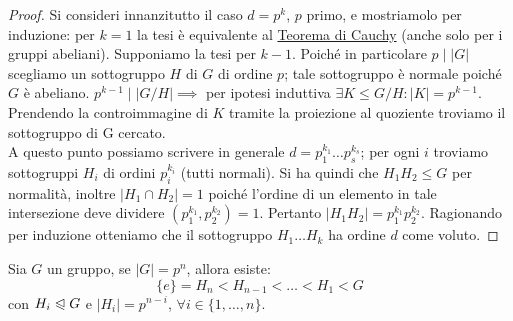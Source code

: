 \documentclass[11pt]{scrartcl}
\begin{document}
\begin{proof}
    Si consideri innanzitutto il caso $d=p^k$, $p$ primo, e mostriamolo per induzione:
    per $k=1$ la tesi è equivalente al \hyperref[p:Cauchy]{Teorema di Cauchy} (anche solo per i gruppi abeliani).
    Supponiamo la tesi per $k-1$. Poiché in particolare $p\mid |G|$ scegliamo un sottogruppo $H$ di $G$ di ordine $p$;
    tale sottogruppo è normale poiché $G$ è abeliano. $p^{k-1}\mid |G/H|\implies$ per ipotesi induttiva $\exists K \leqslant G/H : |K|=p^{k-1}$. 
    Prendendo la controimmagine di $K$ tramite la proiezione al quoziente troviamo il sottogruppo di G cercato. \\ A questo punto possiamo scrivere in generale
    $d=p_1^{k_1}\ldots p_s^{k_s}$; per ogni $i$ troviamo sottogruppi $H_i$ di ordini $p_i^{k_i}$ (tutti normali). Si ha quindi che $H_1H_2\leqslant G$ per normalità,
    inoltre $|H_1\cap H_2|=1$ poiché l'ordine di un elemento in tale intersezione deve dividere $(p_1^{k_1}, p_2^{k_2})=1$. Pertanto $|H_1H_2|=p_1^{k_1}p_2^{k_2}$.
    Ragionando per induzione otteniamo che il sottogruppo $H_1\ldots H_k$ ha ordine $d$ come voluto.
\end{proof}

\newpage

\begin{exercise}
    Sia $G$ un gruppo, se $|G| = p^n$, allora esiste:
        \[ \{e\} = H_n < H_{n-1} < \ldots < H_1 < G
            \]
    con $H_i \trianglelefteqslant G$ e $|H_i| = p^{n-i}$, $\forall i \in \{1,\ldots,n\}$.
\end{exercise}
\end{document}

